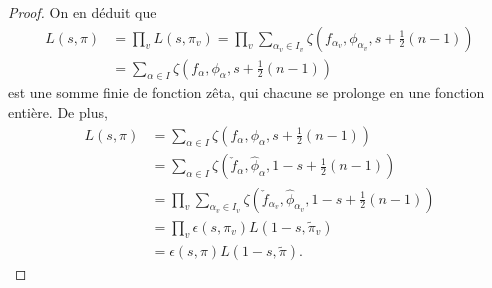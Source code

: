 \begin{proof}
On en déduit que
\begin{align}
L(s, \pi) &= \prod_v L(s, \pi_v) = \prod_v \sum_{\alpha_v \in I_v} \zeta(f_{\alpha_v}, \phi_{\alpha_v}, s + \frac{1}{2}(n-1)) \\
&= \sum_{\alpha \in I} \zeta(f_\alpha, \phi_\alpha, s + \frac{1}{2}(n-1))
\end{align}
est une somme finie de fonction zêta, qui chacune se prolonge en une fonction entière. De plus,
\begin{align}
L(s, \pi) &= \sum_{\alpha \in I} \zeta(f_\alpha, \phi_\alpha, s + \frac{1}{2}(n-1)) \\
&= \sum_{\alpha \in I} \zeta(\check{f}_\alpha, \hat{\phi}_\alpha, 1 - s + \frac{1}{2}(n-1)) \\
&= \prod_v \sum_{\alpha_v \in I_v} \zeta(\check{f}_{\alpha_v}, \hat{\phi}_{\alpha_v}, 1-s + \frac{1}{2}(n-1)) \\
&= \prod_v \epsilon(s, \pi_v) L(1-s, \tilde{\pi}_v) \\
&= \epsilon(s, \pi)L(1-s, \tilde{\pi}).
\end{align}
\end{proof}